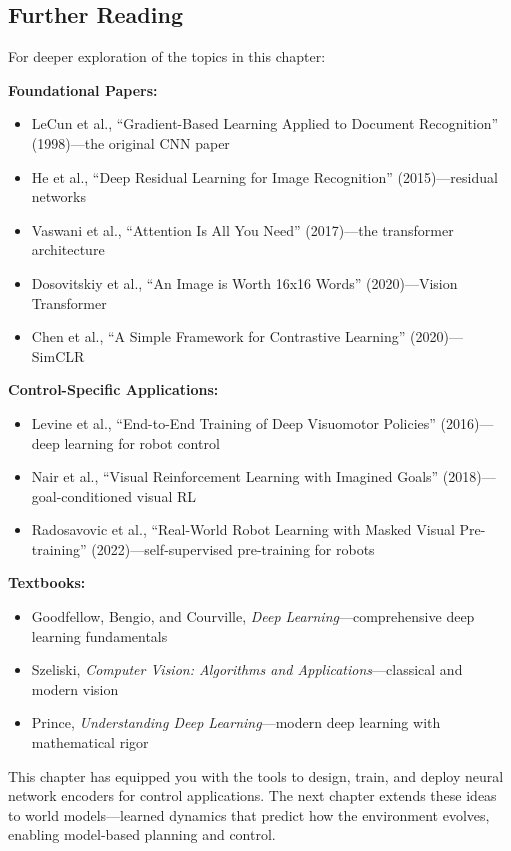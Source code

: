 \subsection{Further Reading}

For deeper exploration of the topics in this chapter:

\textbf{Foundational Papers:}
\begin{itemize}
    \item LeCun et al., ``Gradient-Based Learning Applied to Document Recognition'' (1998)---the original CNN paper
    \item He et al., ``Deep Residual Learning for Image Recognition'' (2015)---residual networks
    \item Vaswani et al., ``Attention Is All You Need'' (2017)---the transformer architecture
    \item Dosovitskiy et al., ``An Image is Worth 16x16 Words'' (2020)---Vision Transformer
    \item Chen et al., ``A Simple Framework for Contrastive Learning'' (2020)---SimCLR
\end{itemize}

\textbf{Control-Specific Applications:}
\begin{itemize}
    \item Levine et al., ``End-to-End Training of Deep Visuomotor Policies'' (2016)---deep learning for robot control
    \item Nair et al., ``Visual Reinforcement Learning with Imagined Goals'' (2018)---goal-conditioned visual RL
    \item Radosavovic et al., ``Real-World Robot Learning with Masked Visual Pre-training'' (2022)---self-supervised pre-training for robots
\end{itemize}

\textbf{Textbooks:}
\begin{itemize}
    \item Goodfellow, Bengio, and Courville, \textit{Deep Learning}---comprehensive deep learning fundamentals
    \item Szeliski, \textit{Computer Vision: Algorithms and Applications}---classical and modern vision
    \item Prince, \textit{Understanding Deep Learning}---modern deep learning with mathematical rigor
\end{itemize}

\vspace{1em}

This chapter has equipped you with the tools to design, train, and deploy neural network encoders for control applications. The next chapter extends these ideas to world models---learned dynamics that predict how the environment evolves, enabling model-based planning and control.

